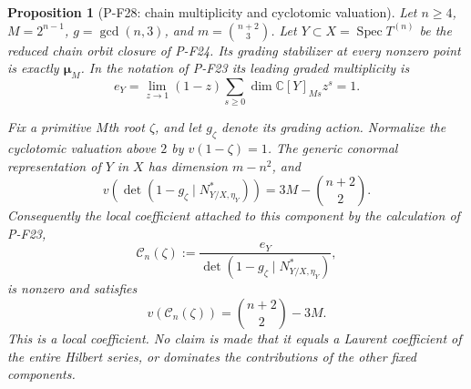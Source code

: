 \documentclass[11pt,a4paper]{article}
\newtheorem{proposition}{Proposition}[section]
\begin{document}
\begin{proposition}[P-F28: chain multiplicity and cyclotomic valuation]
\label{prop:chainlocalcoefficient}
Let $n\ge4$, $M=2^{n-1}$, $g=\gcd(n,3)$, and
$m=\binom{n+2}{3}$. Let $Y\subset X=\operatorname{Spec}T^{(n)}$
be the reduced chain orbit closure of P-F24. Its grading
stabilizer at every nonzero point is exactly
$\boldsymbol\mu_M$. In the notation of P-F23 its leading
graded multiplicity is
\[
 e_Y=\lim_{z\to1}(1-z)
           \sum_{s\ge0}\dim\mathbb C[Y]_{Ms}z^s=1.
 \tag{P-F28a}
\]

Fix a primitive $M$th root $\zeta$, and let $g_\zeta$
denote its grading action. Normalize the cyclotomic
valuation above $2$ by $v(1-\zeta)=1$. The generic
conormal representation of $Y$ in $X$ has dimension
$m-n^2$, and
\[
 v\!\left(\det(1-g_\zeta\mid N^*_{Y/X,\eta_Y})\right)
       =3M-\binom{n+2}{2}.
 \tag{P-F28b}
\]
Consequently the local coefficient attached to this
component by the calculation of P-F23,
\[
 \mathcal C_n(\zeta):=
   \frac{e_Y}{\det(1-g_\zeta\mid N^*_{Y/X,\eta_Y})},
\]
is nonzero and satisfies
\[
 v(\mathcal C_n(\zeta))=\binom{n+2}{2}-3M.
 \tag{P-F28c}
\]
This is a local coefficient. No claim is made that it
equals a Laurent coefficient of the entire Hilbert series,
or dominates the contributions of the other fixed components.
\end{proposition}
\end{document}
